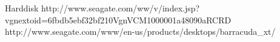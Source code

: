 Harddisk
http://www.seagate.com/ww/v/index.jsp?vgnextoid=6fbdb5ebf32bf210VgnVCM1000001a48090aRCRD
http://www.seagate.com/www/en-us/products/desktops/barracuda_xt/